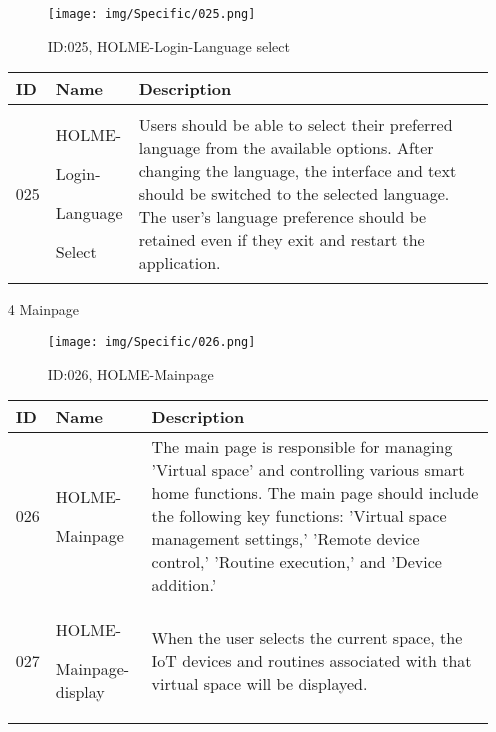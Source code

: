 \documentclass[conference]{IEEEtran}
\begin{document}
\begin{enumerate}
\begin{figure}[h]
\centering
\texttt{[image: img/Specific/025.png]}
\caption{ID:025, HOLME-Login-Language select}
\end{figure}
\begin{table}[h]
\def\arraystretch{1.2} \small
    \begin{tabular}{|p{1cm}|p{1.8cm}|p{5.0cm}|}
        \hline
        ID & Name & Description\\ \hline
         025 \par  & HOLME-\par Login-\par Language \par Select &Users should be able to select their preferred language from the available options. After changing the language, the interface and text should be switched to the selected language. The user's language preference should be retained even if they exit and restart the application.\\ \hline
    \end{tabular}
\end{table}
\clearpage

\item[4] Mainpage\\
\begin{figure}[h]
\centering
\texttt{[image: img/Specific/026.png]}
\caption{ID:026, HOLME-Mainpage}
\end{figure}
\begin{table}[h]
\def\arraystretch{1.2} \small
    \begin{tabular}{|p{1cm}|p{1.8cm}|p{5.0cm}|}
        \hline
        ID & Name & Description\\ \hline
         026 \par  & HOLME-\par Mainpage &The main page is responsible for managing 'Virtual space' and controlling various smart home functions. The main page should include the following key functions: 'Virtual space management settings,' 'Remote device control,' 'Routine execution,' and 'Device addition.'\\ \hline
         027 \par  & HOLME-\par Mainpage-display &When the user selects the current space, the IoT devices and routines associated with that virtual space will be displayed.\\ \hline
    \end{tabular}
\end{table}


\end{enumerate}
\end{document}
